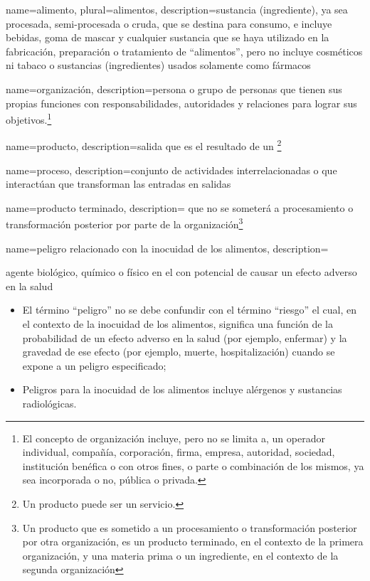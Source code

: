 {
    name={alimento},
    plural={alimentos},
    description={sustancia (ingrediente), ya sea procesada, semi-procesada o cruda, que se destina para consumo, e incluye bebidas, goma de mascar y cualquier sustancia que se haya utilizado en la fabricación, preparación o tratamiento de “alimentos”, pero no incluye cosméticos ni tabaco o sustancias (ingredientes) usados solamente como fármacos}
}

{
    name=organización,
    description={persona o grupo de personas que tienen sus propias funciones con responsabilidades, autoridades y relaciones para lograr sus objetivos.\footnote{El concepto de organización incluye, pero no se limita a, un operador individual, compañía, corporación, firma, empresa, autoridad, sociedad, institución benéfica o con otros fines, o parte o combinación de los mismos, ya sea incorporada o no, pública o privada.}}
}

{
    name=producto,
    description={salida que es el resultado de un \footnote{Un producto puede ser un servicio.}}
}

{
    name=proceso,
    description={conjunto de actividades interrelacionadas o que interactúan que transforman las entradas en salidas}
}

{
    name=producto terminado,
    description={ que no se someterá a procesamiento o transformación posterior por parte de la organización\footnote{Un producto que es sometido a un procesamiento o transformación posterior por otra organización, es un producto terminado, en el contexto de la primera organización, y una materia prima o un ingrediente, en el contexto de la segunda organización}}
}

{
    name={peligro relacionado con la inocuidad de los alimentos},
    description={%
    agente biológico, químico o físico en el  con potencial de causar un efecto adverso en la salud
        \begin{itemize}
            \item[Nota 1] El término “peligro” no se debe confundir con el término “riesgo” el cual, en el contexto de la inocuidad de los alimentos, significa una función de la probabilidad de un efecto adverso en la salud (por ejemplo, enfermar) y la gravedad de ese efecto (por ejemplo, muerte, hospitalización) cuando se expone a un peligro especificado;
            \item[Nota 2] Peligros para la inocuidad de los alimentos incluye alérgenos y sustancias radiológicas.
        \end{itemize}
    }%
}


